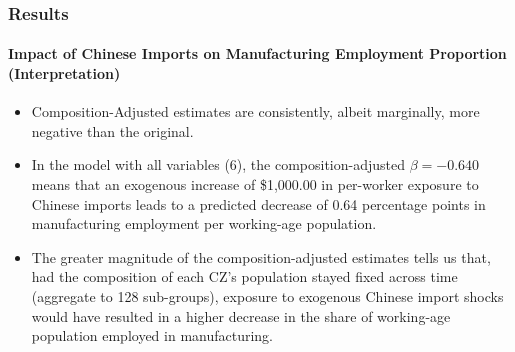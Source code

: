\begin{frame}
    \frametitle{Results}
    \framesubtitle{Impact of Chinese Imports on Manufacturing Employment Proportion (Interpretation)}
    \begin{itemize}
        \item Composition-Adjusted estimates are consistently, albeit marginally, more negative than the original.
        \item In the model with all variables (6), the composition-adjusted $\beta = -0.640$ means that an exogenous increase of \$1,000.00 in per-worker exposure to Chinese imports leads to a predicted decrease of 0.64 percentage points in manufacturing employment per working-age population.
        \item The greater magnitude of the composition-adjusted estimates tells us that, had the composition of each CZ's population stayed fixed across time (aggregate to 128 sub-groups), exposure to exogenous Chinese import shocks would have resulted in a higher decrease in the share of working-age population employed in manufacturing.
    \end{itemize}
\end{frame}
